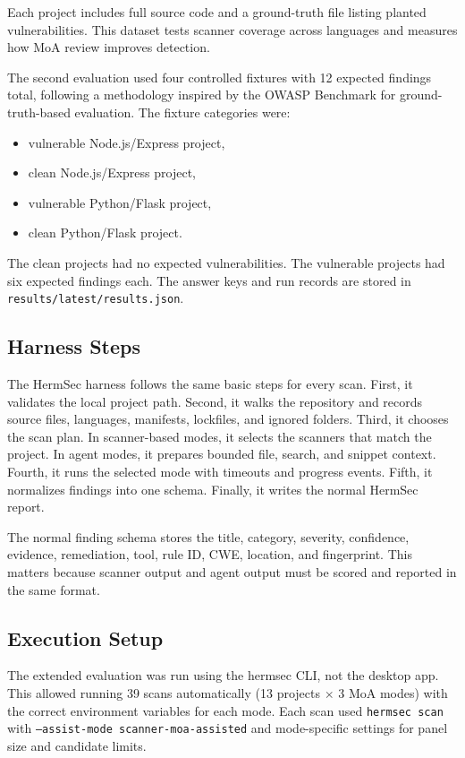 \documentclass[sigconf,nonacm]{acmart}
\newcommand{\LatestResultsPath}{\texttt{results/latest/results.json}}
\begin{document}
Each project includes full source code and a ground-truth file listing planted vulnerabilities. This dataset tests scanner coverage across languages and measures how MoA review improves detection.

The second evaluation used four controlled fixtures with 12 expected findings total, following a methodology inspired by the OWASP Benchmark \cite{owaspbenchmark} for ground-truth-based evaluation. The fixture categories were:

\begin{itemize}
  \item vulnerable Node.js/Express project,
  \item clean Node.js/Express project,
  \item vulnerable Python/Flask project,
  \item clean Python/Flask project.
\end{itemize}

The clean projects had no expected vulnerabilities. The vulnerable projects had six expected findings each. The answer keys and run records are stored in \LatestResultsPath{}.

\subsection{Harness Steps}
The HermSec harness follows the same basic steps for every scan. First, it validates the local project path. Second, it walks the repository and records source files, languages, manifests, lockfiles, and ignored folders. Third, it chooses the scan plan. In scanner-based modes, it selects the scanners that match the project. In agent modes, it prepares bounded file, search, and snippet context. Fourth, it runs the selected mode with timeouts and progress events. Fifth, it normalizes findings into one schema. Finally, it writes the normal HermSec report.

The normal finding schema stores the title, category, severity, confidence, evidence, remediation, tool, rule ID, CWE, location, and fingerprint. This matters because scanner output and agent output must be scored and reported in the same format.

\subsection{Execution Setup}

The extended evaluation was run using the hermsec CLI, not the desktop app. This allowed running 39 scans automatically (13 projects $\times$ 3 MoA modes) with the correct environment variables for each mode. Each scan used \texttt{hermsec scan} with \texttt{--assist-mode scanner-moa-assisted} and mode-specific settings for panel size and candidate limits.
\end{document}

